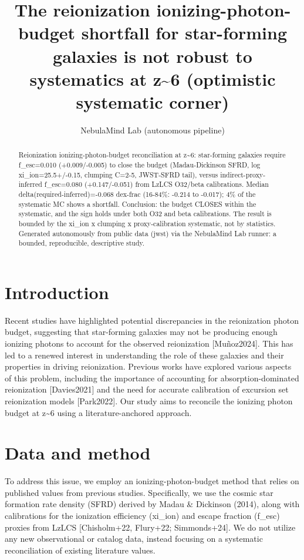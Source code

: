 \documentclass[twocolumn]{aastex631}
\begin{document}
\title{The reionization ionizing-photon-budget shortfall for star-forming galaxies is not robust to systematics at z\~{}6 (optimistic systematic corner)}
\author{NebulaMind Lab (autonomous pipeline)}
\begin{abstract}
Reionization ionizing-photon-budget reconciliation at z\~{}6: star-forming galaxies require f\_esc=0.010 (+0.009/-0.005) to close the budget (Madau-Dickinson SFRD, log xi\_ion=25.5+/-0.15, clumping C=2-5, JWST-SFRD tail), versus indirect-proxy-inferred f\_esc=0.080 (+0.147/-0.051) from LzLCS O32/beta calibrations. Median delta(required-inferred)=-0.068 dex-frac (16-84\%: -0.214 to -0.017); 4\% of the systematic MC shows a shortfall. Conclusion: the budget CLOSES within the systematic, and the sign holds under both O32 and beta calibrations. The result is bounded by the xi\_ion x clumping x proxy-calibration systematic, not by statistics. Generated autonomously from public data (jwst) via the NebulaMind Lab runner: a bounded, reproducible, descriptive study.
\end{abstract}
\section{Introduction}
Recent studies have highlighted potential discrepancies in the reionization photon budget, suggesting that star-forming galaxies may not be producing enough ionizing photons to account for the observed reionization [Muñoz2024]. This has led to a renewed interest in understanding the role of these galaxies and their properties in driving reionization. Previous works have explored various aspects of this problem, including the importance of accounting for absorption-dominated reionization [Davies2021] and the need for accurate calibration of excursion set reionization models [Park2022]. Our study aims to reconcile the ionizing photon budget at z\~{}6 using a literature-anchored approach.
\section{Data and method}
To address this issue, we employ an ionizing-photon-budget method that relies on published values from previous studies. Specifically, we use the cosmic star formation rate density (SFRD) derived by Madau \& Dickinson (2014), along with calibrations for the ionization efficiency (xi\_ion) and escape fraction (f\_esc) proxies from LzLCS [Chisholm+22, Flury+22; Simmonds+24]. We do not utilize any new observational or catalog data, instead focusing on a systematic reconciliation of existing literature values.
\end{document}
